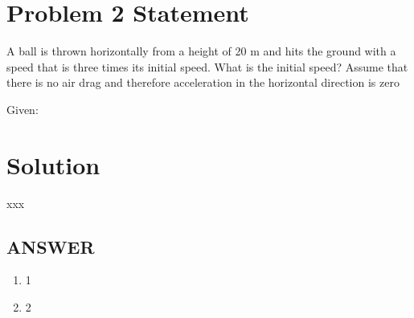 \section*{Problem 2 Statement}

A ball is thrown horizontally from a height of 20 m and hits the ground with a speed that is three
times its initial speed. What is the initial speed? Assume that there is no air drag and therefore
acceleration in the horizontal direction is zero 

\bigbreak Given:

\section*{Solution}





xxx

\vfill
\subsection*{ANSWER}
\begin{enumerate}
    \item 1
    \item 2
\end{enumerate}